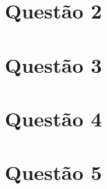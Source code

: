 \documentclass[a4paper,10pt]{article}
\begin{document}
\section{Questão 2}

\section{Questão 3}

\section{Questão 4}

\section{Questão 5}
\end{document}

